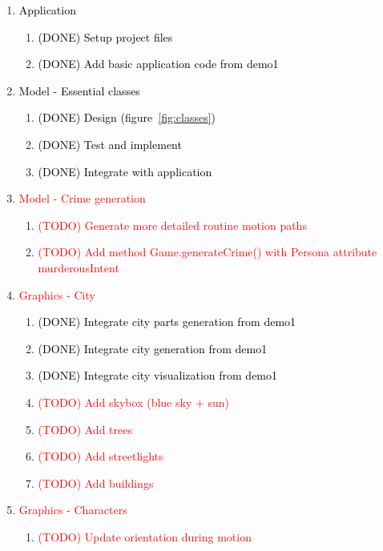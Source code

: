 \documentclass[a4paper, twoside]{article}
\begin{document}
\begin{enumerate}
	\item{} \textcolor{black}{Application} \begin{enumerate}
		\item{} \textcolor{black}{(DONE) Setup project files}
		\item{} \textcolor{black}{(DONE) Add basic application code from demo1}
	\end{enumerate}
	\item{} \textcolor{black}{Model - Essential classes} \begin{enumerate}
		\item{} \textcolor{black}{(DONE) Design (figure~\ref{fig:classes})}
		\item{} \textcolor{black}{(DONE) Test and implement}
		\item{} \textcolor{black}{(DONE) Integrate with application}
	\end{enumerate}
	\item{} \textcolor{red}{Model - Crime generation} \begin{enumerate}
		\item{} \textcolor{red}{(TODO) Generate more detailed routine motion paths}
		\item{} \textcolor{red}{(TODO) Add method Game.generateCrime() with Persona attribute murderousIntent}
	\end{enumerate}
	\item{} \textcolor{red}{Graphics - City} \begin{enumerate}
		\item{} \textcolor{black}{(DONE) Integrate city parts generation from demo1}
		\item{} \textcolor{black}{(DONE) Integrate city generation from demo1}
		\item{} \textcolor{black}{(DONE) Integrate city visualization from demo1}
		\item{} \textcolor{red}{(TODO) Add skybox (blue sky + sun)}
		\item{} \textcolor{red}{(TODO) Add trees}
		\item{} \textcolor{red}{(TODO) Add streetlights}
		\item{} \textcolor{red}{(TODO) Add buildings}
	\end{enumerate}
	\item{} \textcolor{red}{Graphics - Characters} \begin{enumerate}
		\item{} \textcolor{red}{(TODO) Update orientation during motion}

\end{enumerate}
\end{enumerate}
\end{document}
